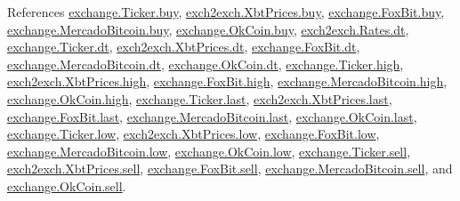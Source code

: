 References \hyperlink{exchange_8py_source_l00048}{exchange.\+Ticker.\+buy}, \hyperlink{exch2exch_8py_source_l00059}{exch2exch.\+Xbt\+Prices.\+buy}, \hyperlink{exchange_8py_source_l00235}{exchange.\+Fox\+Bit.\+buy}, \hyperlink{exchange_8py_source_l00297}{exchange.\+Mercado\+Bitcoin.\+buy}, \hyperlink{exchange_8py_source_l00362}{exchange.\+Ok\+Coin.\+buy}, \hyperlink{exch2exch_8py_source_l00028}{exch2exch.\+Rates.\+dt}, \hyperlink{exchange_8py_source_l00047}{exchange.\+Ticker.\+dt}, \hyperlink{exch2exch_8py_source_l00057}{exch2exch.\+Xbt\+Prices.\+dt}, \hyperlink{exchange_8py_source_l00234}{exchange.\+Fox\+Bit.\+dt}, \hyperlink{exchange_8py_source_l00304}{exchange.\+Mercado\+Bitcoin.\+dt}, \hyperlink{exchange_8py_source_l00369}{exchange.\+Ok\+Coin.\+dt}, \hyperlink{exchange_8py_source_l00050}{exchange.\+Ticker.\+high}, \hyperlink{exch2exch_8py_source_l00061}{exch2exch.\+Xbt\+Prices.\+high}, \hyperlink{exchange_8py_source_l00237}{exchange.\+Fox\+Bit.\+high}, \hyperlink{exchange_8py_source_l00299}{exchange.\+Mercado\+Bitcoin.\+high}, \hyperlink{exchange_8py_source_l00364}{exchange.\+Ok\+Coin.\+high}, \hyperlink{exchange_8py_source_l00052}{exchange.\+Ticker.\+last}, \hyperlink{exch2exch_8py_source_l00063}{exch2exch.\+Xbt\+Prices.\+last}, \hyperlink{exchange_8py_source_l00239}{exchange.\+Fox\+Bit.\+last}, \hyperlink{exchange_8py_source_l00301}{exchange.\+Mercado\+Bitcoin.\+last}, \hyperlink{exchange_8py_source_l00366}{exchange.\+Ok\+Coin.\+last}, \hyperlink{exchange_8py_source_l00051}{exchange.\+Ticker.\+low}, \hyperlink{exch2exch_8py_source_l00062}{exch2exch.\+Xbt\+Prices.\+low}, \hyperlink{exchange_8py_source_l00238}{exchange.\+Fox\+Bit.\+low}, \hyperlink{exchange_8py_source_l00300}{exchange.\+Mercado\+Bitcoin.\+low}, \hyperlink{exchange_8py_source_l00365}{exchange.\+Ok\+Coin.\+low}, \hyperlink{exchange_8py_source_l00049}{exchange.\+Ticker.\+sell}, \hyperlink{exch2exch_8py_source_l00058}{exch2exch.\+Xbt\+Prices.\+sell}, \hyperlink{exchange_8py_source_l00236}{exchange.\+Fox\+Bit.\+sell}, \hyperlink{exchange_8py_source_l00298}{exchange.\+Mercado\+Bitcoin.\+sell}, and \hyperlink{exchange_8py_source_l00363}{exchange.\+Ok\+Coin.\+sell}.


